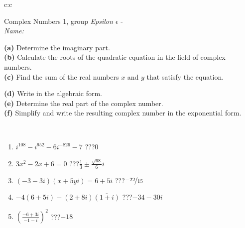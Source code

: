 \documentclass[10pt]{report}
\begin{document}
\begin{tabular}{c:c}
\begin{minipage}[c][104.5mm][t]{0.5\linewidth}
\begin{center}
\vspace{5mm}
{\huge Complex Numbers 1, group \textit{Epsilon $\epsilon$} -}\\[5mm]
\textit{Name:}\phantom{xxxxxxxxxxxxxxxxxxxxxxxxxxxxxxxxxxxxxxxxxxxxxxxxxxxxxxxxxxxxxxxxx}\\[5mm]
\begin{minipage}{0.95\linewidth}
\begin{center}
{\small \begin{minipage}{0.44\textwidth} \raggedright
\textbf{(a)} Determine the imaginary part. \\[1mm]
\textbf{(b)} Calculate the roots of the quadratic equation in the field of complex numbers. \\[1mm]
\textbf{(c)} Find the sum of the real numbers \(x\) and \(y\) that satisfy the equation. \end{minipage} \begin{minipage}{0.54\textwidth}
\textbf{(d)} Write in the algebraic form. \\[1mm]
\textbf{(e)} Determine the real part of the complex number. \\[1mm]
\textbf{(f)} Simplify and write the resulting complex number in the exponential form.
\end{minipage}
} \vspace{3mm}
\end{center}
\end{minipage}
\\[1mm]
\begin{minipage}{0.79\linewidth}
\begin{center}
\begin{varwidth}{\linewidth}
\setlength{\itemsep}{0pt}
\begin{enumerate}
\large
\item $i^{108}-i^{952}-6i^{-826}-7$\quad \dotfill\; ???\;\dotfill \quad $0$
\item $3x^2-2x+6=0$\quad \dotfill\; ???\;\dotfill \quad $\frac{1}{3} \pm{}\frac{ \sqrt{68}}{6}i$
\item $(-3-3i)(x+5yi)=6+5i$\quad \dotfill\; ???\;\dotfill \quad $\nicefrac{-22}{15}$
\item $-4(6+5i)-(2+8i)\overline{(1+i)}$\quad \dotfill\; ???\;\dotfill \quad $-34-30i$
\item $\left(\frac{-6+3i}{-1-i}\right)^2$\quad \dotfill\; ???\;\dotfill \quad $-18$

\end{enumerate}
\end{varwidth}
\end{center}
\end{minipage}
\end{center}
\end{minipage}
\end{tabular}
\end{document}
